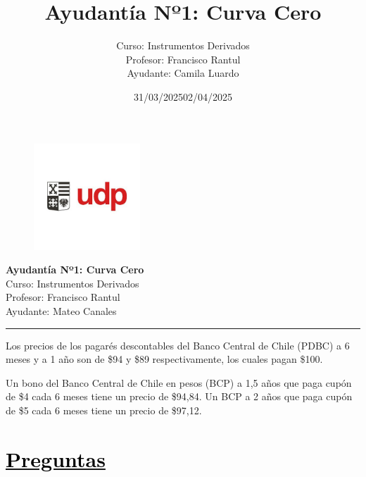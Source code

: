\documentclass[12pt]{article}
\title{Ayudantía Nº1: Curva Cero}
\author{Curso: Instrumentos Derivados\\
Profesor: Francisco Rantul\\
Ayudante: Camila Luardo}
\date{31/03/2025}
\newcommand{\subrayadoRojo}[1]{{\color{rojoudp}\underline{\textcolor{black}{#1}}}}
\begin{document}
\begin{figure}
    \vspace{-5em}    
    \flushright
    \includegraphics[height=4cm]{../imagenes/logo.png}\\[-3em]
\end{figure}
\begin{center}
    {\LARGE \textbf{Ayudantía Nº1: Curva Cero}}\\[0.5em]
    Curso: Instrumentos Derivados\\
    Profesor: Francisco Rantul\\
    Ayudante: Mateo Canales\\
    \date{02/04/2025}
\end{center}
\vspace{1pt}
{\color{rojoudp}\hrule height 2pt}
\vspace{10pt}

Los precios de los pagarés descontables del Banco Central de Chile (PDBC)
 a 6 meses y a 1 año son de \$94 y \$89 respectivamente, los cuales pagan \$100. 
  
 Un bono del Banco Central de Chile en pesos (BCP) a 1,5 años que paga cupón de 
 \$4 cada 6 meses tiene un precio de \$94{,}84. Un BCP a 2 años que paga
 cupón de \$5 cada 6 meses tiene un precio de \$97{,}12.

\section*{\subrayadoRojo{Preguntas}}
\end{document}

